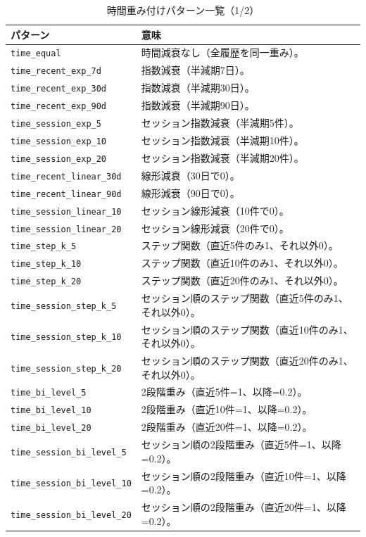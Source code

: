 \begin{table}[htbp]
\centering
\caption{時間重み付けパターン一覧（1/2）}
\scriptsize
\begin{tabularx}{\linewidth}{l X}
\hline
パターン & 意味 \\
\hline
\texttt{time\_equal} & 時間減衰なし（全履歴を同一重み）。 \\
\texttt{time\_recent\_exp\_7d} & 指数減衰（半減期7日）。 \\
\texttt{time\_recent\_exp\_30d} & 指数減衰（半減期30日）。 \\
\texttt{time\_recent\_exp\_90d} & 指数減衰（半減期90日）。 \\
\texttt{time\_session\_exp\_5} & セッション指数減衰（半減期5件）。 \\
\texttt{time\_session\_exp\_10} & セッション指数減衰（半減期10件）。 \\
\texttt{time\_session\_exp\_20} & セッション指数減衰（半減期20件）。 \\
\texttt{time\_recent\_linear\_30d} & 線形減衰（30日で0）。 \\
\texttt{time\_recent\_linear\_90d} & 線形減衰（90日で0）。 \\
\texttt{time\_session\_linear\_10} & セッション線形減衰（10件で0）。 \\
\texttt{time\_session\_linear\_20} & セッション線形減衰（20件で0）。 \\
\texttt{time\_step\_k\_5} & ステップ関数（直近5件のみ1、それ以外0）。 \\
\texttt{time\_step\_k\_10} & ステップ関数（直近10件のみ1、それ以外0）。 \\
\texttt{time\_step\_k\_20} & ステップ関数（直近20件のみ1、それ以外0）。 \\
\texttt{time\_session\_step\_k\_5} & セッション順のステップ関数（直近5件のみ1、それ以外0）。 \\
\texttt{time\_session\_step\_k\_10} & セッション順のステップ関数（直近10件のみ1、それ以外0）。 \\
\texttt{time\_session\_step\_k\_20} & セッション順のステップ関数（直近20件のみ1、それ以外0）。 \\
\texttt{time\_bi\_level\_5} & 2段階重み（直近5件=1、以降=0.2）。 \\
\texttt{time\_bi\_level\_10} & 2段階重み（直近10件=1、以降=0.2）。 \\
\texttt{time\_bi\_level\_20} & 2段階重み（直近20件=1、以降=0.2）。 \\
\texttt{time\_session\_bi\_level\_5} & セッション順の2段階重み（直近5件=1、以降=0.2）。 \\
\texttt{time\_session\_bi\_level\_10} & セッション順の2段階重み（直近10件=1、以降=0.2）。 \\
\texttt{time\_session\_bi\_level\_20} & セッション順の2段階重み（直近20件=1、以降=0.2）。 \\
\hline
\end{tabularx}
\end{table}

